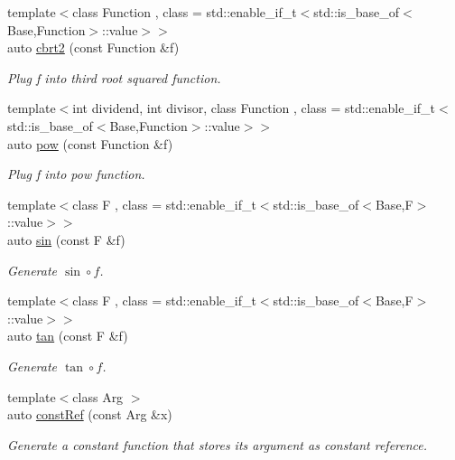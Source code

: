 \begin{DoxyCompactItemize}
{\footnotesize template$<$class Function , class  = std\-::enable\-\_\-if\-\_\-t$<$std\-::is\-\_\-base\-\_\-of$<$\-Base,\-Function$>$\-::value$>$$>$ }\\auto \hyperlink{namespaceFunG_afd27322fb64c6df3366f384c93819a06}{cbrt2} (const Function \&f)
\begin{DoxyCompactList}\small\item\em Plug f into third root squared function. \end{DoxyCompactList}\item 
{\footnotesize template$<$int dividend, int divisor, class Function , class  = std\-::enable\-\_\-if\-\_\-t$<$std\-::is\-\_\-base\-\_\-of$<$\-Base,\-Function$>$\-::value$>$$>$ }\\auto \hyperlink{namespaceFunG_aecae6fa60bbfc0eb1867581ee4577d4e}{pow} (const Function \&f)
\begin{DoxyCompactList}\small\item\em Plug f into pow function. \end{DoxyCompactList}\item 
{\footnotesize template$<$class F , class  = std\-::enable\-\_\-if\-\_\-t$<$std\-::is\-\_\-base\-\_\-of$<$\-Base,\-F$>$\-::value$>$$>$ }\\auto \hyperlink{namespaceFunG_a16cb0176856a3ca12223e9ae1658a5c5}{sin} (const F \&f)
\begin{DoxyCompactList}\small\item\em Generate $ \sin\circ f $. \end{DoxyCompactList}\item 
{\footnotesize template$<$class F , class  = std\-::enable\-\_\-if\-\_\-t$<$std\-::is\-\_\-base\-\_\-of$<$\-Base,\-F$>$\-::value$>$$>$ }\\auto \hyperlink{namespaceFunG_a943f42a40000538ee5dabcc4632d4d18}{tan} (const F \&f)
\begin{DoxyCompactList}\small\item\em Generate $ \tan\circ f $. \end{DoxyCompactList}\item 
{\footnotesize template$<$class Arg $>$ }\\auto \hyperlink{namespaceFunG_abcfb38c2e995436816ea884803302f2d}{const\-Ref} (const Arg \&x)
\begin{DoxyCompactList}\small\item\em Generate a constant function that stores its argument as constant reference. \end{DoxyCompactList}\item 

\end{DoxyCompactItemize}
